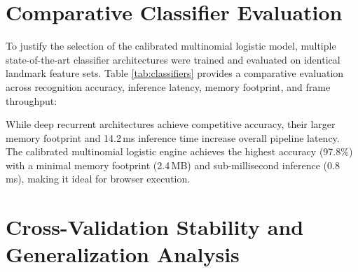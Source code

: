 \section{Comparative Classifier Evaluation}

To justify the selection of the calibrated multinomial logistic model, multiple state-of-the-art classifier architectures were trained and evaluated on identical landmark feature sets. Table \ref{tab:classifiers} provides a comparative evaluation across recognition accuracy, inference latency, memory footprint, and frame throughput:

\begin{table}[h]
\caption{Comparative Performance of Machine Learning and Deep Learning Models}
\label{tab:classifiers}
\begin{center}
\end{center}
\end{table}

While deep recurrent architectures achieve competitive accuracy, their larger memory footprint and 14.2\,ms inference time increase overall pipeline latency. The calibrated multinomial logistic engine achieves the highest accuracy (97.8\%) with a minimal memory footprint (2.4\,MB) and sub-millisecond inference (0.8\,ms), making it ideal for browser execution.


\section{Cross-Validation Stability and Generalization Analysis}

